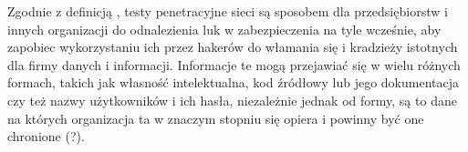 Zgodnie z definicją \cite{He2006}, testy penetracyjne sieci są sposobem dla przedsiębiorstw i innych organizacji do odnalezienia luk w zabezpieczenia na tyle wcześnie, aby zapobiec wykorzystaniu ich przez hakerów do włamania się i kradzieży istotnych dla firmy danych i informacji. Informacje te mogą przejawiać się w wielu różnych formach, takich jak własność intelektualna, kod źródłowy lub jego dokumentacja czy też nazwy użytkowników i ich hasła, niezależnie jednak od formy, są to dane na których organizacja ta w znaczym stopniu się opiera i powinny być one chronione (?)\cite{}. 



